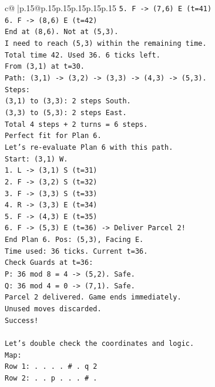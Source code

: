 \documentclass{article}
\begin{document}
{\begin{supertabular}{c@{$\;$}|p{.15\linewidth}@{}p{.15\linewidth}p{.15\linewidth}p{.15\linewidth}p{.15\linewidth}p{.15\linewidth}}
{{{\texttt{5. F {-}> (7,6) E (t=41)} \\
\texttt{6. F {-}> (8,6) E (t=42)} \\
\texttt{End at (8,6). Not at (5,3).} \\
\texttt{I need to reach (5,3) within the remaining time.} \\
\texttt{Total time 42. Used 36. 6 ticks left.} \\
\texttt{From (3,1) at t=30.} \\
\texttt{Path: (3,1) {-}> (3,2) {-}> (3,3) {-}> (4,3) {-}> (5,3).} \\
\texttt{Steps:} \\
\texttt{(3,1) to (3,3): 2 steps South.} \\
\texttt{(3,3) to (5,3): 2 steps East.} \\
\texttt{Total 4 steps + 2 turns = 6 steps.} \\
\texttt{Perfect fit for Plan 6.} \\
\texttt{Let's re{-}evaluate Plan 6 with this path.} \\
\texttt{Start: (3,1) W.} \\
\texttt{1. L {-}> (3,1) S (t=31)} \\
\texttt{2. F {-}> (3,2) S (t=32)} \\
\texttt{3. F {-}> (3,3) S (t=33)} \\
\texttt{4. R {-}> (3,3) E (t=34)} \\
\texttt{5. F {-}> (4,3) E (t=35)} \\
\texttt{6. F {-}> (5,3) E (t=36) {-}> Deliver Parcel 2!} \\
\texttt{End Plan 6. Pos: (5,3), Facing E.} \\
\texttt{Time used: 36 ticks. Current t=36.} \\
\texttt{Check Guards at t=36:} \\
\texttt{P: 36 mod 8 = 4 {-}> (5,2). Safe.} \\
\texttt{Q: 36 mod 4 = 0 {-}> (7,1). Safe.} \\
\texttt{Parcel 2 delivered. Game ends immediately.} \\
\texttt{Unused moves discarded.} \\
\texttt{Success!} \\
\\ 
\texttt{Let's double check the coordinates and logic.} \\
\texttt{Map:} \\
\texttt{Row 1: . . . . \# . q 2} \\
\texttt{Row 2: . . p . . . \# .} \\
}}}
\end{supertabular}}
\end{document}
